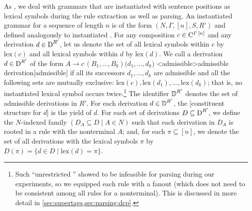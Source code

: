 \documentclass[../../document.tex]{subfiles}
\begin{document}
    As , we deal with  grammars that are instantiated with sentence positions as lexical symbols during the rule extraction as well as parsing.
    An instantiated  grammar for a sequence of length \(n\) is of the form \((N, \varGamma, [n], S, R')\) and defined analogously to instantiated .
    For any composition \(c \in \mathrm{C}^{\varGamma\,[n]}\) and any derivation \(d \in \operatorname{D}^{R'}\), let us denote the set of all lexical symbols within \(c\) by \(\mathrm{lex}(c)\) and all lexical symbols within \(d\) by \(\mathrm{lex}(d)\).
    We call a derivation \(d \in \operatorname{D}^{R'}\) of the form \(A \to c\,(B_1, \ldots, B_k) \big( d_1, \ldots, d_k \big)\) <admissible>{admissible  derivation}[admissible] if all its successors \(d_1, \ldots, d_k\) are admissible and all the following sets are mutually exclusive: \(\mathrm{lex}(c), \mathrm{lex}(d_1), \ldots, \mathrm{lex}(d_k)\); that is, no instantiated lexical symbol occurs twice.\footnote{
        Such ``unrestricted '' showed to be infeasible for parsing during our experiments, so we equipped each rule with a fanout (which does not need to be consistent among all rules for a  nonterminal).
        This is discussed in more detail in \cref{sec:supertags,sec:parsing:dcp}.
    }
    The identifier \(\operatorname{\mathbb{D}}^{R'}\) denotes the set of admissible derivations in \(R'\).
    For each derivation \(d \in \operatorname{\mathbb{D}}^{R'}\), the [constituent structure for \(d\)] is the yield of \(d\).
    For each set of  derivations \(D \subseteq \operatorname{D}^{R'}\), we define the \(N\)-indexed family \((D_A \subseteq D \mid A \in N)\) such that each derivation in \(D_A\) is rooted in a rule with the  nonterminal \(A\); and, for each \(\pi \subseteq [n]\), we denote the set of all derivations with the lexical symbols \(\pi\) by \(D(\pi) = \{d\in D \mid \mathrm{lex}(d) = \pi\}\).
\end{document}
